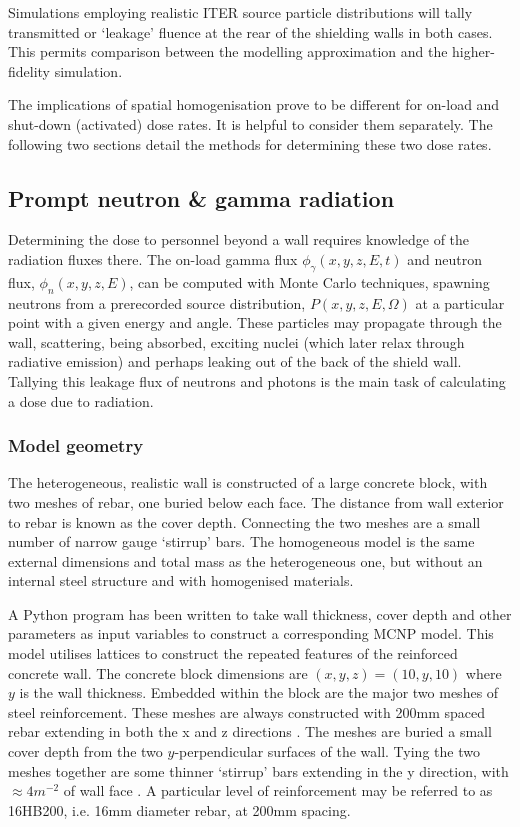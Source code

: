 Simulations employing realistic ITER source particle distributions will tally transmitted or `leakage' fluence at the rear of the shielding walls in both cases. This permits comparison between the modelling approximation and the higher-fidelity simulation.

The implications of spatial homogenisation prove to be different for on-load and shut-down (activated) dose rates. It is helpful to consider them separately. The following two sections detail the methods for determining these two dose rates.

\subsection{Prompt neutron \& gamma radiation}
Determining the dose to personnel beyond a wall requires knowledge of the radiation fluxes there. The on-load gamma flux $\phi_{\gamma}(x,y,z,E,t)$ and neutron flux, $\phi_{n}(x,y,z,E)$, can be computed with Monte Carlo techniques, spawning neutrons from a prerecorded source distribution, $P(x,y,z,E,\Omega)$ at a particular point with a given energy and angle. These particles may propagate through the wall, scattering, being absorbed, exciting nuclei (which later relax through radiative emission) and perhaps leaking out of the back of the shield wall. Tallying this leakage flux of neutrons and photons is the main task of calculating a dose due to radiation.

\subsubsection{Model geometry}
The heterogeneous, realistic wall is constructed of a large concrete block, with two meshes of rebar, one buried below each face. The distance from wall exterior to rebar is known as the cover depth. Connecting the two meshes are a small number of narrow gauge `stirrup' bars. The homogeneous model is the same external dimensions and total mass as the heterogeneous one, but without an internal steel structure and with homogenised materials.

A Python program has been written to take wall thickness, cover depth and other parameters as input variables to construct a corresponding MCNP model. This model utilises lattices to construct the repeated features of the reinforced concrete wall. The concrete block dimensions are $(x, y, z) = (10, y, 10)$ where $y$ is the wall thickness. Embedded within the block are the major two meshes of steel reinforcement. These meshes are always constructed with 200mm spaced rebar extending in both the x and z directions \cite{Perez14}. The meshes are buried a small cover depth from the two $y$-perpendicular surfaces of the wall. Tying the two meshes together are some thinner `stirrup' bars extending in the y direction, with $\approx 4m^{-2}$ of wall face \cite{Perez14}. A particular level of reinforcement may be referred to as 16HB200, i.e. 16mm diameter rebar, at 200mm spacing.

